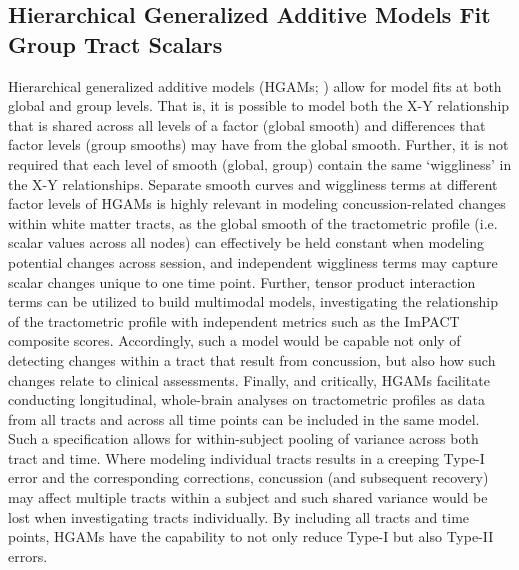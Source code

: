 \documentclass[12pt]{article}
\begin{document}
\subsection{Hierarchical Generalized Additive Models Fit Group Tract Scalars}
\label{ssec:meth-gam}
Hierarchical generalized additive models (HGAMs; \cite{pedersen2019HierarchicalGeneralizedAdditive}) allow for model fits at both global and group levels. That is, it is possible to model both the X-Y relationship that is shared across all levels of a factor (global smooth) and differences that factor levels (group smooths) may have from the global smooth. Further, it is not required that each level of smooth (global, group) contain the same `wiggliness' in the X-Y relationships. Separate smooth curves and wiggliness terms at different factor levels of HGAMs is highly relevant in modeling concussion-related changes within white matter tracts, as the global smooth of the tractometric profile (i.e. scalar values across all nodes) can effectively be held constant when modeling potential changes across session, and independent wiggliness terms may capture scalar changes unique to one time point. Further, tensor product interaction terms can be utilized to build multimodal models, investigating the relationship of the tractometric profile with independent metrics such as the ImPACT composite scores. Accordingly, such a model would be capable not only of detecting changes within a tract that result from concussion, but also how such changes relate to clinical assessments. Finally, and critically, HGAMs facilitate conducting longitudinal, whole-brain analyses on tractometric profiles as data from all tracts and across all time points can be included in the same model. Such a specification allows for within-subject pooling of variance across both tract and time. Where modeling individual tracts results in a creeping Type-I error and the corresponding corrections, concussion (and subsequent recovery) may affect multiple tracts within a subject and such shared variance would be lost when investigating tracts individually. By including all tracts and time points, HGAMs have the capability to not only reduce Type-I but also Type-II errors.
\end{document}
